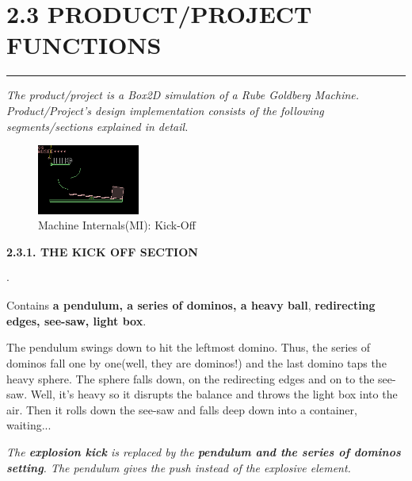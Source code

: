 \documentclass{report}
\begin{document}

\section*{2.3 PRODUCT/PROJECT FUNCTIONS}
\hrule
\large
\emph{The product/project is a Box2D simulation of a Rube Goldberg Machine. Product/Project's design implementation consists of the following segments/sections explained in detail.}\\
\begin{figure}
\begin{center}
\includegraphics[width=0.3\textwidth, height=0.2\textwidth]{latex/box2d_1.png}
\end{center}
\caption{Machine Internals(MI): Kick-Off}\vspace{-10pt}
\end{figure}
\textbf{2.3.1. THE KICK OFF SECTION}
\begin{list}{$\cdot$}{\setlength{\leftmargin}{0em}}
\item Contains \textbf{a pendulum\cite{pendulum}, a series of dominos\cite{dominos}, a heavy ball}, \textbf{redirecting edges, see-saw, light box}.
\item The pendulum swings down to hit the leftmost domino. Thus, the series of dominos fall one by one(well, they are dominos!) and the last domino taps the heavy sphere. The sphere falls down, on  the redirecting edges and on to the see-saw. Well, it's heavy so it disrupts the balance and throws the light box into the air. Then it rolls down the see-saw and falls deep down into a container, waiting... 
\item \emph{The \textbf{explosion\cite{explosion} kick} is replaced by the \textbf{pendulum and the series of dominos setting}. The pendulum gives the push instead of the explosive element.}\\
\end{list}
\end{document}
